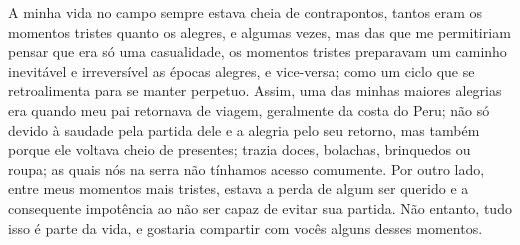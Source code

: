 A minha vida no campo sempre estava cheia de contrapontos, tantos eram os momentos tristes quanto os alegres, e algumas vezes, mas das que me permitiriam pensar que era só uma casualidade, os momentos tristes preparavam um caminho inevitável e irreversível as épocas alegres, e vice-versa; como um ciclo que se retroalimenta para se manter perpetuo. 
Assim, uma das minhas maiores alegrias era quando meu pai retornava de viagem, geralmente da costa do Peru; não só devido à saudade pela partida dele e a alegria pelo seu retorno, mas também porque ele voltava cheio de presentes; trazia doces, bolachas, brinquedos ou roupa; as quais nós na serra não tínhamos acesso comumente.
Por outro lado, entre meus momentos mais tristes, estava a perda de algum ser querido e a consequente impotência ao não ser capaz de evitar sua partida. 
Não entanto, tudo isso é parte da vida, e gostaria compartir com vocês alguns desses momentos.




